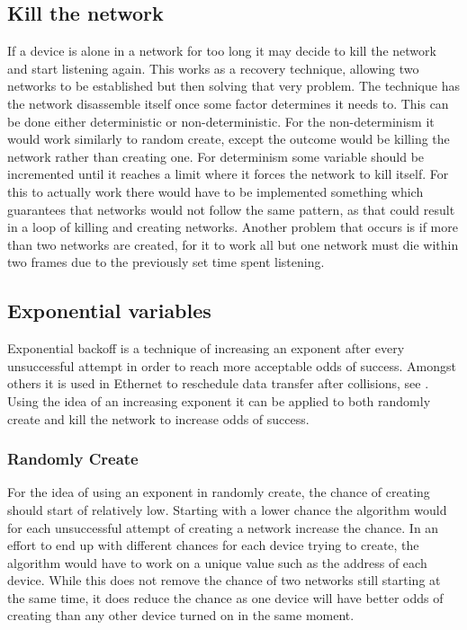 \subsection{Kill the network}\label{KtN}
If a device is alone in a network for too long it may decide to kill the network and start listening again.
This works as a recovery technique, allowing two networks to be established but then solving that very problem.
The technique has the network disassemble itself once some factor determines it needs to.
This can be done either deterministic or non-deterministic.
For the non-determinism it would work similarly to random create, except the outcome would be killing the network rather than creating one.
For determinism some variable should be incremented until it reaches a limit where it forces the network to kill itself.
For this to actually work there would have to be implemented something which guarantees that networks would not follow the same pattern, as that could result in a loop of killing and creating networks.
Another problem that occurs is if more than two networks are created, for it to work all but one network must die within two frames due to the previously set time spent listening.

\subsection{Exponential variables}
Exponential backoff is a technique of increasing an exponent after every unsuccessful attempt in order to reach more acceptable odds of success.
Amongst others it is used in Ethernet to reschedule data transfer after collisions, see \citep{Ebackoff}.
Using the idea of an increasing exponent it can be applied to both randomly create and kill the network to increase odds of success.
\subsubsection*{Randomly Create}
For the idea of using an exponent in randomly create, the chance of creating should start of relatively low.
Starting with a lower chance the algorithm would for each unsuccessful attempt of creating a network increase the chance.
In an effort to end up with different chances for each device trying to create, the algorithm would have to work on a unique value such as the address of each device.
While this does not remove the chance of two networks still starting at the same time, it does reduce the chance as one device will have better odds of creating than any other device turned on in the same moment.
